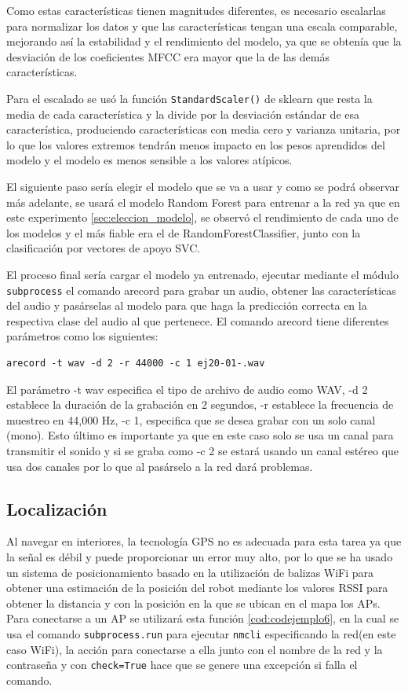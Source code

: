 Como estas características tienen magnitudes diferentes, es necesario escalarlas para normalizar los datos y que las características tengan una escala comparable, mejorando así la estabilidad y el rendimiento del modelo, ya que se obtenía que la desviación de los coeficientes MFCC era mayor que la de las demás características. 

Para el escalado se usó la función \verb|StandardScaler()| de sklearn que resta la media de cada característica y la divide por la desviación estándar de esa característica, produciendo características con media cero y varianza unitaria, por lo que los valores extremos tendrán menos impacto en los pesos aprendidos del modelo y el modelo es menos sensible a los valores atípicos. 

El siguiente paso sería elegir el modelo que se va a usar y como se podrá observar más adelante, se usará el modelo Random Forest para entrenar a la red ya que en este experimento \ref{sec:eleccion_modelo}, se observó el rendimiento de cada uno de los modelos y el más fiable era el de RandomForestClassifier, junto con la clasificación por vectores de apoyo SVC.

El proceso final sería cargar el modelo ya entrenado, ejecutar mediante el módulo \texttt{subprocess} el comando arecord para grabar un audio, obtener las características del audio y pasárselas al modelo para que haga la predicción correcta en la respectiva clase del audio al que pertenece. El comando arecord tiene diferentes parámetros como los siguientes: 

\begin{verbatim}
arecord -t wav -d 2 -r 44000 -c 1 ej20-01-.wav 
\end{verbatim}

El parámetro -t wav especifica el tipo de archivo de audio como WAV, -d 2 establece la duración de la grabación en 2 segundos, -r establece la frecuencia de muestreo en 44,000 Hz, -c 1, especifica que se desea grabar con un solo canal (mono). Esto último es importante ya que en este caso solo se usa un canal para transmitir el sonido y si se graba como -c 2 se estará usando un canal estéreo que usa dos canales por lo que al pasárselo a la red dará problemas.


\subsection{Localización}
\label{subsec:localización}

Al navegar en interiores, la tecnología GPS no es adecuada para esta tarea ya que la señal es débil y puede proporcionar un error muy alto, por lo que se ha usado un sistema de posicionamiento basado en la utilización de balizas WiFi para obtener una estimación de la posición del robot mediante los valores RSSI para obtener la distancia y con la posición en la que se ubican en el mapa los APs. Para conectarse a un AP se utilizará esta función \ref{cod:codejemplo6}, en la cual se usa el comando \texttt{subprocess.run} para ejecutar \texttt{nmcli} especificando la red(en este caso WiFi), la acción para conectarse a ella junto con el nombre de la red y la contraseña y con \texttt{check=True} hace que se genere una excepción si falla el comando.\\


